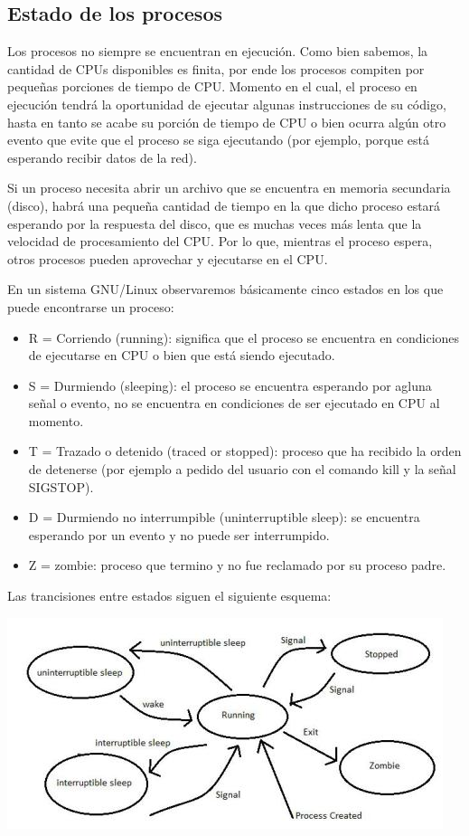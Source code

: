 \documentclass[12pt]{article}
\begin{document}
\subsection*{Estado de los procesos}

Los procesos no siempre se encuentran en ejecución. Como bien sabemos, la 
cantidad de CPUs disponibles es finita, por ende los procesos compiten por 
pequeñas porciones de tiempo de CPU. Momento en el cual, el proceso en 
ejecución tendrá la oportunidad de ejecutar algunas instrucciones de su 
código, hasta en tanto se acabe su porción de tiempo de CPU o bien ocurra 
algún otro evento que evite que el proceso se siga ejecutando (por ejemplo, 
porque está esperando recibir datos de la red). 

Si un proceso necesita abrir un archivo que se encuentra en 
memoria secundaria (disco), habrá una pequeña cantidad de tiempo en la que 
dicho proceso estará esperando por la respuesta del disco, que es muchas 
veces más lenta que la velocidad de procesamiento del CPU. Por lo que, mientras
el proceso espera, otros procesos pueden aprovechar y ejecutarse en el CPU. 
  
En un sistema GNU/Linux observaremos básicamente cinco estados en los que 
puede encontrarse un proceso: 
\begin{itemize}
\item R = Corriendo (running): significa que el proceso se encuentra en 
condiciones de ejecutarse en CPU o bien que está siendo ejecutado.  
\item S = Durmiendo (sleeping): el proceso se encuentra esperando por 
agluna señal o evento, no se encuentra en condiciones de ser ejecutado en 
CPU al momento. 
\item T = Trazado o detenido (traced or stopped): proceso que ha recibido 
la orden de detenerse (por ejemplo a pedido del usuario con el comando 
kill y la señal SIGSTOP). 
\item D = Durmiendo no interrumpible (uninterruptible sleep): se encuentra
esperando por un evento y no puede ser interrumpido. 
\item Z = zombie: proceso que termino y no fue reclamado por su proceso 
padre. 
\end{itemize}

Las trancisiones entre estados siguen el siguiente esquema: 
\begin{center}
 \includegraphics{process-states-s.jpg}
\end{center}
\end{document}

